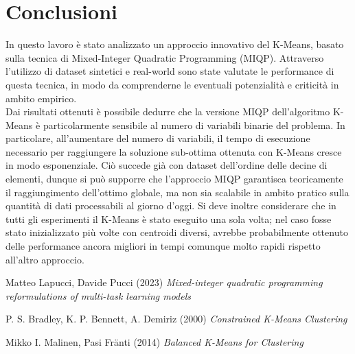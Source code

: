 \documentclass{article}
\begin{document}
    \section{Conclusioni}
    In questo lavoro è stato analizzato un approccio innovativo del K-Means, basato sulla tecnica di Mixed-Integer Quadratic Programming (MIQP). Attraverso l'utilizzo di dataset sintetici e real-world sono state valutate le performance di questa tecnica, in modo da comprenderne le eventuali potenzialità e criticità in ambito empirico.\\
    Dai risultati ottenuti è possibile dedurre che la versione MIQP dell'algoritmo K-Means è particolarmente sensibile al numero di variabili binarie del problema. In particolare, all'aumentare del numero di variabili, il tempo di esecuzione necessario per raggiungere la soluzione sub-ottima ottenuta con K-Means cresce in modo esponenziale. Ciò succede già con dataset dell'ordine delle decine di elementi, dunque si può supporre che l'approccio MIQP garantisca teoricamente il raggiungimento dell'ottimo globale, ma non sia scalabile in ambito pratico sulla quantità di dati processabili al giorno d'oggi. Si deve inoltre considerare che in tutti gli esperimenti il K-Means è stato eseguito una sola volta; nel caso fosse stato inizializzato più volte con centroidi diversi, avrebbe probabilmente ottenuto delle performance ancora migliori in tempi comunque molto rapidi rispetto all'altro approccio.\\


    \begin{thebibliography}{9}
Matteo Lapucci, Davide Pucci (2023) \emph{Mixed-integer quadratic programming reformulations of multi-task learning models}

P. S. Bradley, K. P. Bennett, A. Demiriz (2000) \emph{Constrained K-Means Clustering}

Mikko I. Malinen, Pasi Fränti (2014) \emph{Balanced K-Means for Clustering}

\end{thebibliography}
\end{document}
